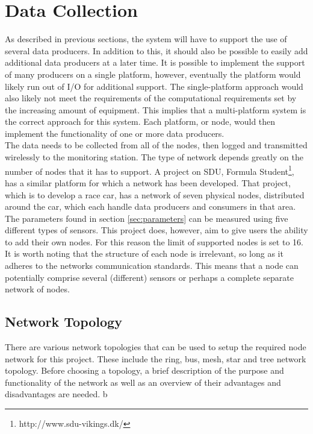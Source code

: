 
\section{Data Collection}
\label{sec:data_collection}
As described in previous sections, the system will have to support the use of several data producers.
In addition to this, it should also be possible to easily add additional data producers at a later time.
It is possible to implement the support of many producers on a single platform, however, eventually the platform would likely run out of I/O for additional support.
The single-platform approach would also likely not meet the requirements of the computational requirements set by the increasing amount of equipment.
This implies that a multi-platform system is the correct approach for this system.
Each platform, or node, would then implement the functionality of one or more data producers.\\
The data needs to be collected from all of the nodes, then logged and transmitted wirelessly to the monitoring station.
The type of network depends greatly on the number of nodes that it has to support.
A project on SDU, Formula Student\footnote{http://www.sdu-vikings.dk/}, has a similar platform for which a network has been developed.
That project, which is to develop a race car, has a network of seven physical nodes, distributed around the car, which each handle data producers and consumers in that area.
The parameters found in section \ref{sec:parameters} can be measured using five different types of sensors.
This project does, however, aim to give users the ability to add their own nodes.
For this reason the limit of supported nodes is set to 16.
It is worth noting that the structure of each node is irrelevant, so long as it adheres to the networks communication standards.
This means that a node can potentially comprise several (different) sensors or perhaps a complete separate network of nodes.

\subsection{Network Topology}

There are various network topologies that can be used to setup the required node network for this project.
These include the ring, bus, mesh, star and tree network topology. 
Before choosing a topology, a brief description of the purpose and functionality of the network as well as an overview of their advantages and disadvantages are needed. 
b
